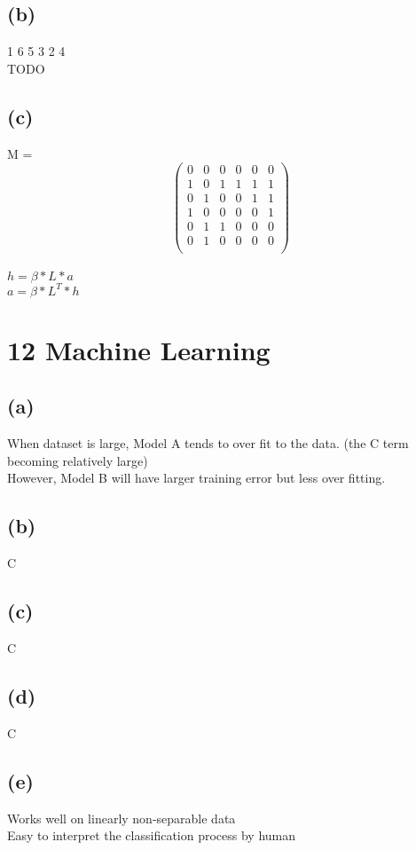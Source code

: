 \documentclass{article}
\begin{document}
\subsection{(b)}
 1 6 5 3 2 4 \\
TODO
\subsection{(c)}
M = \[ \left(
\begin{array}{cccccc}
0 & 0 & 0 & 0 & 0 & 0 \\
1 & 0 & 1 & 1 & 1 & 1 \\
0 & 1 & 0 & 0 & 1 & 1 \\
1 & 0 & 0 & 0 & 0 & 1 \\
0 & 1 & 1 & 0 & 0 & 0 \\
0 & 1 & 0 & 0 & 0 & 0 \\
\end{array}
\right)\]  \\

$h = \beta * L * a$ \\
$a = \beta * L^T * h$ \\

\section{12 Machine Learning}
\subsection{(a)}
When dataset is large, Model A tends to over fit to the data. (the C term becoming relatively large) \\
However, Model B will have larger training error but less over fitting.

\subsection{(b)}
C

\subsection{(c)}
C

\subsection{(d)}
C

\subsection{(e)}
Works well on  linearly non-separable data\\
Easy to interpret the classification process by human \\
\end{document}
